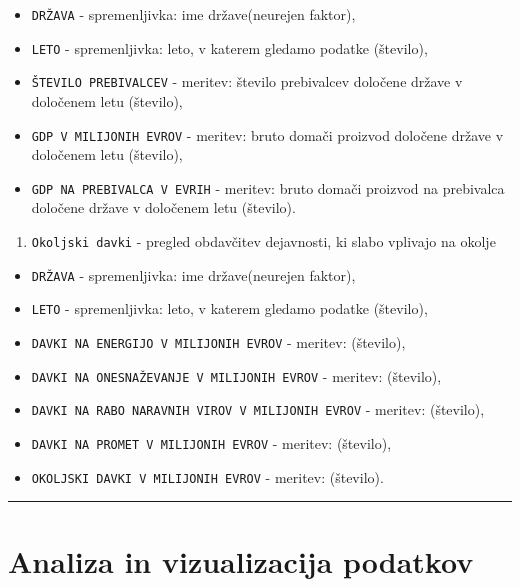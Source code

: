 \documentclass[]{article}
\providecommand{\tightlist}{%
  \setlength{\itemsep}{0pt}\setlength{\parskip}{0pt}}
\begin{document}
\begin{itemize}
\tightlist
\item
  \texttt{DRŽAVA} - spremenljivka: ime države(neurejen faktor),
\item
  \texttt{LETO} - spremenljivka: leto, v katerem gledamo podatke
  (število),
\item
  \texttt{ŠTEVILO\ PREBIVALCEV} - meritev: število prebivalcev določene
  države v določenem letu (število),
\item
  \texttt{GDP\ V\ MILIJONIH\ EVROV} - meritev: bruto domači proizvod
  določene države v določenem letu (število),
\item
  \texttt{GDP\ NA\ PREBIVALCA\ V\ EVRIH} - meritev: bruto domači
  proizvod na prebivalca določene države v določenem letu (število).
\end{itemize}

\begin{enumerate}
\def\labelenumi{\arabic{enumi}.}
\setcounter{enumi}{2}
\tightlist
\item
  \texttt{Okoljski\ davki} - pregled obdavčitev dejavnosti, ki slabo
  vplivajo na okolje
\end{enumerate}

\begin{itemize}
\tightlist
\item
  \texttt{DRŽAVA} - spremenljivka: ime države(neurejen faktor),
\item
  \texttt{LETO} - spremenljivka: leto, v katerem gledamo podatke
  (število),
\item
  \texttt{DAVKI\ NA\ ENERGIJO\ V\ MILIJONIH\ EVROV} - meritev:
  (število),
\item
  \texttt{DAVKI\ NA\ ONESNAŽEVANJE\ V\ MILIJONIH\ EVROV} - meritev:
  (število),
\item
  \texttt{DAVKI\ NA\ RABO\ NARAVNIH\ VIROV\ V\ MILIJONIH\ EVROV} -
  meritev: (število),
\item
  \texttt{DAVKI\ NA\ PROMET\ V\ MILIJONIH\ EVROV} - meritev: (število),
\item
  \texttt{OKOLJSKI\ DAVKI\ V\ MILIJONIH\ EVROV} - meritev: (število).
\end{itemize}

\begin{center}\rule{0.5\linewidth}{\linethickness}\end{center}

\section{Analiza in vizualizacija
podatkov}\label{analiza-in-vizualizacija-podatkov}
\end{document}
